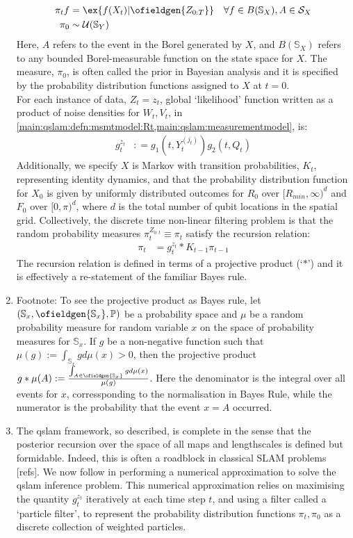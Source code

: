 \begin{enumerate}
\begin{defn}
\begin{align}
	\pi_t f &= \ex{f(X_t) |  \ofieldgen{Z_{0:T}}} \quad \forall f \in B(\mathbb{S}_X), A \in \mathcal{S}_X \\
	\pi_0 & \sim \mathcal{U}(\mathbb{S}_Y)
	\end{align} Here, $A$ refers to the event in the Borel \ofield generated by $X$, and $B(\mathbb{S}_X)$ refers to any bounded Borel-measurable function on the state space for $X$. The measure, $\pi_0$, is often called the prior in Bayesian analysis and it is specified by the probability distribution functions assigned to $X$ at $t=0$. \\
	For each instance of data, $Z_t=z_t$,  global `likelihood' function written as a product of noise densities for $W_t, V_t$, in \cref{main:qslam:defn:msmtmodel:Rt,main:qslam:measurementmodel}, is:
	\begin{align}
	g_t^{z_t} &: = g_1(t, Y_t^{(j_t)}) g_2(t, Q_t) \label{main:qslam:defn:globallikelihood}
	\end{align}
	Additionally, we specify $X$ is Markov with transition probabilities, $K_{t}$,  representing identity dynamics, and that the probability distribution function for $X_0$ is given by uniformly distributed outcomes for $R_0$ over $[R_{min}, \infty)^d$ and $F_0$ over  $[0, \pi)^d$, where $d$ is the total number of qubit locations in the spatial grid. 
	Collectively, the discrete time non-linear filtering problem is that the random probability measures $\pi_t^{Z_{0:t}} \equiv \pi_t$ satisfy the recursion relation:
	\begin{align}
	\pi_t &= g_t^{z_t} * K_{t-1} \pi_{t-1} 
	\end{align} The recursion relation is defined in terms of a projective product (`$*$') and it is effectively a re-statement of the familiar Bayes rule. 
\end{defn}
\item Footnote: To see the projective product as Bayes rule, let $(\mathbb{S}_x, \ofieldgen{\mathbb{S}_x}, \mathbb{P})$ be a probability space and $\mu$ be a random probability measure for random variable $x$ on the space of probability measures for $\mathbb{S}_x$. If $g$ be a non-negative function such that $\mu(g) := \int_{\mathbb{S}_x} g d\mu(x)  > 0 $, then the projective product $g * \mu(A) :=\frac{\int_{A \in \ofieldgen{\mathbb{S}_x}} g d\mu(x) }{\mu(g)}$. Here the denominator is the integral over all events for $x$, corressponding to the normalisation in Bayes Rule, while the numerator is the probability that the event $x=A$ occurred.  
\item The qslam framework, so described, is complete in the sense that the posterior recursion over the space of all maps and lengthscales is defined but formidable. Indeed, this is often a roadblock in classical SLAM problems [refs]. We now follow \cite{thrun2001probabilistic} in performing a numerical approximation to solve the qslam inference problem. This numerical approximation relies on maximising the quantity $g_t^{z_t}$ iteratively at each time step $t$, and using a filter called a `particle filter', to represent the probability distribution functions $\pi_{t}, \pi_{0}$ as a discrete collection of weighted particles.

\end{enumerate}
